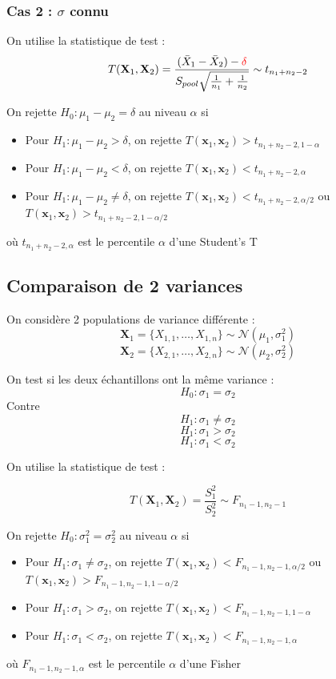 \documentclass[12pt,a4paper]{article}
\begin{document}
\subsubsection{Cas 2 : $\sigma$ connu}

On utilise la statistique de test :
$$
T(\mathbf{X}_1, \mathbf{X}_2) = \frac{(\bar{X}_1 - \bar{X}_2) - \color{red}{\delta}}{S_{pool}\sqrt{\frac{1}{n_1} + \frac{1}{n_2}}} \sim t_{n_1+n_2-2}
$$

On rejette $H_0 : \mu_1 - \mu_2 = \delta$ au niveau $\alpha$ si
\begin{itemize}
    \item Pour $H_1 : \mu_1 - \mu_2 > \delta$, on rejette $T(\mathbf{x}_1,\mathbf{x}_2) > t_{n_1+n_2 -2,1-\alpha}$
    \item Pour $H_1 : \mu_1 - \mu_2 < \delta$, on rejette $T(\mathbf{x}_1,\mathbf{x}_2) < t_{n_1+n_2-2, \alpha}$
    \item Pour $H_1 : \mu_1 - \mu_2 \neq \delta$, on rejette $T(\mathbf{x}_1,\mathbf{x}_2) < t_{n_1+n_2-2, \alpha/2}$ ou $T(\mathbf{x}_1,\mathbf{x}_2) > t_{n_1+n_2-2, 1-\alpha/2}$
\end{itemize}
où $t_{n_1+n_2-2, \alpha}$ est le percentile $\alpha$ d'une Student's T


\subsection{Comparaison de 2 variances}

On considère 2 populations de variance différente :
$$\mathbf{X}_1 = \{X_{1,1}, \dots, X_{1,n}\} \sim \mathcal{N} (\mu_1, \sigma_1^2)$$
$$\mathbf{X}_2 = \{X_{2,1}, \dots, X_{2,n}\} \sim \mathcal{N} (\mu_2, \sigma_2^2)$$

On test si les deux échantillons ont la même variance :
$$H_0 : \sigma_1 = \sigma_2$$
Contre
$$H_1 : \sigma_1 \neq \sigma_2$$
$$H_1 : \sigma_1 > \sigma_2$$
$$H_1 : \sigma_1 < \sigma_2$$

On utilise la statistique de test :

$$T(\mathbf{X}_1, \mathbf{X}_2) = \frac{S_1^2}{S_2^2} \sim F_{n_1 - 1, n_2 - 1}$$

On rejette $H_0 : \sigma^2_1 = \sigma^2_2$ au niveau $\alpha$ si
\begin{itemize}
    \item Pour $H_1 : \sigma_1 \neq \sigma_2$, on rejette $T(\mathbf{x}_1,\mathbf{x}_2) < F_{n_1-1,n_2-1, \alpha/2}$ ou $T(\mathbf{x}_1,\mathbf{x}_2) > F_{n_1-1,n_2-1, 1-\alpha/2}$
    \item Pour $H_1 : \sigma_1 > \sigma_2$, on rejette $T(\mathbf{x}_1,\mathbf{x}_2) < F_{n_1-1,n_2-1, 1-\alpha}$
    \item Pour $H_1 : \sigma_1 < \sigma_2$, on rejette $T(\mathbf{x}_1,\mathbf{x}_2) < F_{n_1-1,n_2-1, \alpha}$
\end{itemize}
où $F_{n_1-1,n_2-1, \alpha}$ est le percentile $\alpha$ d'une Fisher
\end{document}
